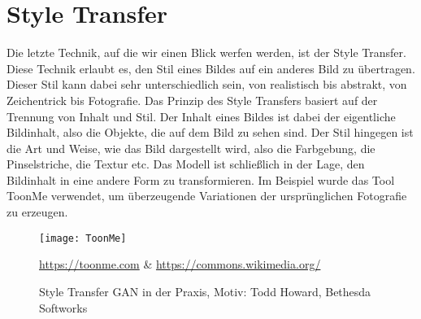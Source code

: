 \section{Style Transfer}

\noindent Die letzte Technik, auf die wir einen Blick werfen werden, ist der Style Transfer. Diese Technik erlaubt es, den Stil eines Bildes auf ein anderes Bild zu übertragen. Dieser Stil kann dabei sehr unterschiedlich sein, von realistisch bis abstrakt, von Zeichentrick bis Fotografie. Das Prinzip des Style Transfers basiert auf der Trennung von Inhalt und Stil. Der Inhalt eines Bildes ist dabei der eigentliche Bildinhalt, also die Objekte, die auf dem Bild zu sehen sind. Der Stil hingegen ist die Art und Weise, wie das Bild dargestellt wird, also die Farbgebung, die Pinselstriche, die Textur etc. Das Modell ist schließlich in der Lage, den Bildinhalt in eine andere Form zu transformieren. Im Beispiel wurde das Tool ToonMe verwendet, um überzeugende Variationen der ursprünglichen Fotografie zu erzeugen.\\

\begin{figure}[H]
    \centering
    \texttt{[image: ToonMe]}
    \caption{Style Transfer GAN in der Praxis, Motiv: Todd Howard, Bethesda Softworks} \quelle\url{https://toonme.com} \& \url{https://commons.wikimedia.org/}
\label{fig:deep_learning}
\end{figure}

\newpage
